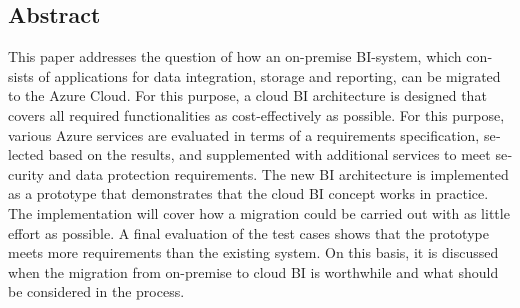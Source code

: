 

\begin{otherlanguage}{american}
	\chapter*{Abstract}
This paper addresses the question of how an on-premise BI-system, which consists of applications for data integration, storage and reporting, can be migrated to the Azure Cloud. For this purpose, a cloud BI architecture is designed that covers all required functionalities as cost-effectively as possible. For this purpose, various Azure services are evaluated in terms of a requirements specification, selected based on the results, and supplemented with additional services to meet security and data protection requirements.
The new BI architecture is implemented as a prototype that demonstrates that the cloud BI concept works in practice. The implementation will cover how a migration could be carried out with as little effort as possible. A final evaluation of the test cases shows that the prototype meets more requirements than the existing system. On this basis, it is discussed when the migration from on-premise to cloud BI is worthwhile and what should be considered in the process. \end{otherlanguage}